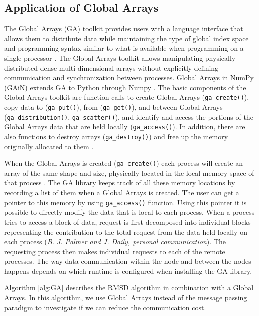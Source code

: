 \subsection{Application of Global Arrays}
The Global Arrays (GA) toolkit provides users with a language interface that allows them to distribute data while maintaining the type of global index space and programming syntax similar to what is available when programming on a single processor \cite{GA}. The Global Arrays toolkit allows manipulating physically distributed dense multi-dimensional arrays without explicitly defining communication and synchronization between processes.
Global Arrays in NumPy (GAiN) extends GA to Python through Numpy \cite{GAiN}. 
The basic components of the Global Arrays toolkit are function calls to create Global Arrays (\texttt{ga\_create()}), copy data to (\texttt{ga\_put()}), from (\texttt{ga\_get()}), and between Global Arrays (\texttt{ga\_distribution()}, \texttt{ga\_scatter()}), and identify and access the portions of the Global Arrays data that are held locally (\texttt{ga\_access()}). 
In addition, there are also functions to destroy arrays (\texttt{ga\_destroy()}) and free up the memory originally allocated to them \cite{GAiN}.

When the Global Arrays is created (\texttt{ga\_create()}) each process will create an array of the same shape and size, physically located in the local memory space of that process \cite{GA}. 
The GA library keeps track of all these memory locations by recording a list of them when a Global Arrays is created. 
The user can get a pointer to this memory by using \texttt{ga\_access()} function.
Using this pointer it is possible to directly modify the data that is local to each process.
When a process tries to access a block of data, request is first decomposed into individual blocks representing the contribution to the total request from the data held locally on each process (\textit{B. J. Palmer and J. Daily, personal communication}).
The requesting process then makes individual requests to each of the remote processes. 
The way data communication within the node and between the nodes happens depends on which runtime is configured when installing the GA library.

Algorithm \ref{alg:GA} describes the RMSD algorithm in combination with a Global Arrays.
In this algorithm, we use Global Arrays instead of the message passing paradigm to investigate if we can reduce the communication cost. 

